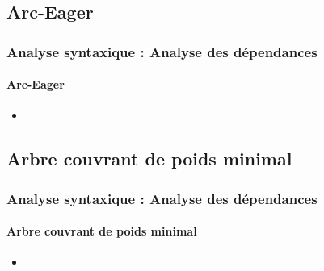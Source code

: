 \documentclass[xcolor=table]{beamer}
\begin{document}
\subsection{Arc-Eager}

\begin{frame}
\frametitle{Analyse syntaxique : Analyse des dépendances}
\framesubtitle{Arc-Eager}

\begin{itemize}
	\item 
\end{itemize}

\end{frame}

\subsection{Arbre couvrant de poids minimal}

\begin{frame}
\frametitle{Analyse syntaxique : Analyse des dépendances}
\framesubtitle{Arbre couvrant de poids minimal}

\begin{itemize}
	\item 
\end{itemize}

\end{frame}

\end{document}
